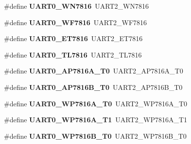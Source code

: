 \begin{DoxyCompactItemize}
\#define {\bfseries U\+A\+R\+T0\+\_\+\+W\+N7816}~U\+A\+R\+T2\+\_\+\+W\+N7816
\item 
\mbox{\label{group___s_d_k___compatibility___symbols_ga1f1678af59afd4e7ada94a6f9a4c1219}} 
\#define {\bfseries U\+A\+R\+T0\+\_\+\+W\+F7816}~U\+A\+R\+T2\+\_\+\+W\+F7816
\item 
\mbox{\label{group___s_d_k___compatibility___symbols_ga102073e04fc50eb8630e872fde79057b}} 
\#define {\bfseries U\+A\+R\+T0\+\_\+\+E\+T7816}~U\+A\+R\+T2\+\_\+\+E\+T7816
\item 
\mbox{\label{group___s_d_k___compatibility___symbols_ga813072777f5a1c29a9195a9401724fe7}} 
\#define {\bfseries U\+A\+R\+T0\+\_\+\+T\+L7816}~U\+A\+R\+T2\+\_\+\+T\+L7816
\item 
\mbox{\label{group___s_d_k___compatibility___symbols_ga18fcae96ca36cf47d32fd4b861380efd}} 
\#define {\bfseries U\+A\+R\+T0\+\_\+\+A\+P7816\+A\+\_\+\+T0}~U\+A\+R\+T2\+\_\+\+A\+P7816\+A\+\_\+\+T0
\item 
\mbox{\label{group___s_d_k___compatibility___symbols_ga2cc5a6fe792a421ca3086507c1d14454}} 
\#define {\bfseries U\+A\+R\+T0\+\_\+\+A\+P7816\+B\+\_\+\+T0}~U\+A\+R\+T2\+\_\+\+A\+P7816\+B\+\_\+\+T0
\item 
\mbox{\label{group___s_d_k___compatibility___symbols_ga75e9b492aa2d21baac37036370127b83}} 
\#define {\bfseries U\+A\+R\+T0\+\_\+\+W\+P7816\+A\+\_\+\+T0}~U\+A\+R\+T2\+\_\+\+W\+P7816\+A\+\_\+\+T0
\item 
\mbox{\label{group___s_d_k___compatibility___symbols_ga20efa29fec94bed08a151aa40c12a785}} 
\#define {\bfseries U\+A\+R\+T0\+\_\+\+W\+P7816\+A\+\_\+\+T1}~U\+A\+R\+T2\+\_\+\+W\+P7816\+A\+\_\+\+T1
\item 
\mbox{\label{group___s_d_k___compatibility___symbols_gafb9dfcccfd558427b44133736409e547}} 
\#define {\bfseries U\+A\+R\+T0\+\_\+\+W\+P7816\+B\+\_\+\+T0}~U\+A\+R\+T2\+\_\+\+W\+P7816\+B\+\_\+\+T0

\end{DoxyCompactItemize}
